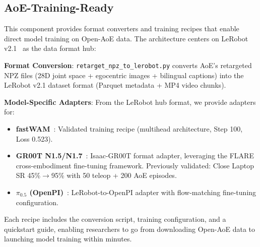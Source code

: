 \subsection{AoE-Training-Ready}

This component provides format converters and training recipes that enable direct model training on Open-AoE data. The architecture centers on LeRobot v2.1~\cite{lerobot2024} as the data format hub:

\textbf{Format Conversion}: \texttt{retarget\_npz\_to\_lerobot.py} converts AoE's retargeted NPZ files (28D joint space + egocentric images + bilingual captions) into the LeRobot v2.1 dataset format (Parquet metadata + MP4 video chunks).

\textbf{Model-Specific Adapters}: From the LeRobot hub format, we provide adapters for:
\begin{itemize}
    \item \textbf{fastWAM}~\cite{fastwam2025}: Validated training recipe (multihead architecture, Step 100, Loss 0.523).
    \item \textbf{GR00T N1.5/N1.7}~\cite{groot2025}: Isaac-GR00T format adapter, leveraging the FLARE~\cite{flare2025} cross-embodiment fine-tuning framework. Previously validated: Close Laptop SR 45\%$\to$95\% with 50 teleop + 200 AoE episodes.
    \item \textbf{$\pi_{0.5}$ (OpenPI)}~\cite{pi05}: LeRobot-to-OpenPI adapter with flow-matching fine-tuning configuration.
\end{itemize}

Each recipe includes the conversion script, training configuration, and a quickstart guide, enabling researchers to go from downloading Open-AoE data to launching model training within minutes.
